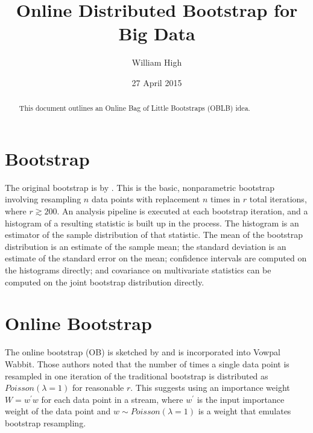 \documentclass{article}
\begin{document}
%

\title{Online Distributed Bootstrap for Big Data}
\author{William High}
\date{27 April 2015}
\maketitle

\begin{abstract}

This document outlines an Online Bag of Little Bootstraps (OBLB) idea.

\end{abstract}

\section{Bootstrap}

The original bootstrap is by \cite{bib:efron}. This is the basic,
nonparametric bootstrap involving resampling $n$ data points with replacement
$n$ times in $r$ total iterations, where $r \gtrsim 200$. An analysis pipeline
is executed at each bootstrap iteration, and a histogram of a resulting
statistic is built up in the process. The histogram is an estimator of the
sample distribution of that statistic. The mean of the bootstrap distribution
is an estimate of the sample mean; the standard deviation is an estimate of
the standard error on the mean; confidence intervals are computed on the
histograms directly; and covariance on multivariate statistics can be computed
on the joint bootstrap distribution directly.

\section{Online Bootstrap}

The online bootstrap (OB) is sketched by \cite{bib:onlineboot} and is
incorporated into Vowpal Wabbit. Those authors noted that the number of times
a single data point is resampled in one iteration of the traditional bootstrap
is distributed as $Poisson(\lambda = 1)$ for reasonable $r$. This suggests
using an importance weight $W = w^{\prime}w$ for each data point in a stream,
where $w^{\prime}$ is the input importance weight of the data point and $w
\sim Poisson(\lambda = 1)$ is a weight that emulates bootstrap resampling.
\end{document}
